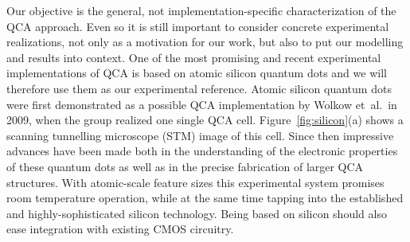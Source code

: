Our objective is the general, not implementation-specific characterization of
the QCA approach. Even so it is still important to consider concrete
experimental realizations, not only as a motivation for our work, but also to
put our modelling and results into context. One of the most promising and recent
experimental implementations of QCA is based on atomic silicon quantum dots and
we will therefore use them as our experimental reference. Atomic silicon quantum
dots were first demonstrated as a possible QCA implementation by Wolkow et~al.\
in 2009, when the group realized one single QCA cell.
Figure~\ref{fig:silicon}(a) shows a scanning tunnelling microscope (STM) image
of this cell. Since then impressive advances have been made both in the
understanding of the electronic properties of these quantum dots as well as in
the precise fabrication of larger QCA structures. With atomic-scale feature
sizes this experimental system promises room temperature operation, while at the
same time tapping into the established and highly-sophisticated silicon
technology. Being based on silicon should also ease integration with existing
CMOS circuitry.

